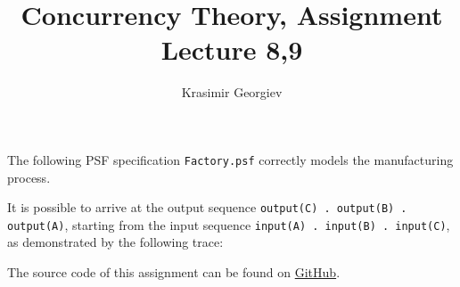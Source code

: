 \documentclass[a4paper]{article}
\title{Concurrency Theory, Assignment Lecture 8,9}
\author{Krasimir Georgiev}
\begin{document}
\maketitle

The following PSF specification \texttt{Factory.psf} correctly models the
manufacturing process.

It is possible to arrive at the output sequence \texttt{output(C) . output(B) .
    output(A)}, starting from the input sequence \texttt{input(A) . input(B) .
input(C)}, as demonstrated by the following trace:


The source code of this assignment can be found on
\href{https://github.com/comco/concurrency-theory-assignments/tree/master/assignment-lecture-8,9}{GitHub}.
\end{document}
